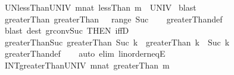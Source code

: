 \begin{isabellebody}
\ UN{\isacharunderscore}{\kern0pt}lessThan{\isacharunderscore}{\kern0pt}UNIV{\isacharcolon}{\kern0pt}\ {\isachardoublequoteopen}{\isacharparenleft}{\kern0pt}{\isasymUnion}m{\isacharcolon}{\kern0pt}{\isacharcolon}{\kern0pt}nat{\isachardot}{\kern0pt}\ lessThan\ m{\isacharparenright}{\kern0pt}\ {\isacharequal}{\kern0pt}\ UNIV{\isachardoublequoteclose}\isanewline
%
\isadelimproof
%
\endisadelimproof
%
\isatagproof
{}\isamarkupfalse%
\ blast%
\endisatagproof
{\isafoldproof}%
%
\isadelimproof
%
\endisadelimproof
%
\isadelimdocument
%
\endisadelimdocument
%
\isatagdocument
%
\isamarkuptrue%
%
\endisatagdocument
{\isafolddocument}%
%
\isadelimdocument
%
\endisadelimdocument
{}\isamarkupfalse%
\ greaterThan{\isacharunderscore}{\kern0pt}{}{\isacharcolon}{\kern0pt}\ {\isachardoublequoteopen}greaterThan\ {}\ {\isacharequal}{\kern0pt}\ range\ Suc{\isachardoublequoteclose}\isanewline
%
\isadelimproof
\ \ %
\endisadelimproof
%
\isatagproof
{}\isamarkupfalse%
\ greaterThan{\isacharunderscore}{\kern0pt}def\isanewline
\ \ \isamarkupfalse%
\ {\isacharparenleft}{\kern0pt}blast\ dest{\isacharcolon}{\kern0pt}\ gr{}{\isacharunderscore}{\kern0pt}conv{\isacharunderscore}{\kern0pt}Suc\ {\isacharbrackleft}{\kern0pt}THEN\ iffD{}{\isacharbrackright}{\kern0pt}{\isacharparenright}{\kern0pt}%
\endisatagproof
{\isafoldproof}%
%
\isadelimproof
\isanewline
%
\endisadelimproof
\isanewline
{}\isamarkupfalse%
\ greaterThan{\isacharunderscore}{\kern0pt}Suc{\isacharcolon}{\kern0pt}\ {\isachardoublequoteopen}greaterThan\ {\isacharparenleft}{\kern0pt}Suc\ k{\isacharparenright}{\kern0pt}\ {\isacharequal}{\kern0pt}\ greaterThan\ k\ {\isacharminus}{\kern0pt}\ {\isacharbraceleft}{\kern0pt}Suc\ k{\isacharbraceright}{\kern0pt}{\isachardoublequoteclose}\isanewline
%
\isadelimproof
\ \ %
\endisadelimproof
%
\isatagproof
{}\isamarkupfalse%
\ greaterThan{\isacharunderscore}{\kern0pt}def\isanewline
\ \ \isamarkupfalse%
\ {\isacharparenleft}{\kern0pt}auto\ elim{\isacharcolon}{\kern0pt}\ linorder{\isacharunderscore}{\kern0pt}neqE{\isacharparenright}{\kern0pt}%
\endisatagproof
{\isafoldproof}%
%
\isadelimproof
\isanewline
%
\endisadelimproof
\isanewline
{}\isamarkupfalse%
\ INT{\isacharunderscore}{\kern0pt}greaterThan{\isacharunderscore}{\kern0pt}UNIV{\isacharcolon}{\kern0pt}\ {\isachardoublequoteopen}{\isacharparenleft}{\kern0pt}{\isasymInter}m{\isacharcolon}{\kern0pt}{\isacharcolon}{\kern0pt}nat{\isachardot}{\kern0pt}\ greaterThan\ m{\isacharparenright}{\kern0pt}\ {\isacharequal}{\kern0pt}\ {\isacharbraceleft}{\kern0pt}{\isacharbraceright}{\kern0pt}{\isachardoublequoteclose}\isanewline

\end{isabellebody}
